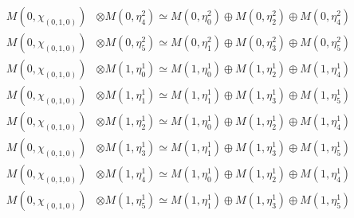 \begin{align*}
M(0,\chi_{(0,1,0)}) &\otimes M(0,\eta^{2}_{4}) \simeq M(0,\eta^{2}_{0}) \oplus M(0,\eta^{2}_{2}) \oplus M(0,\eta^{2}_{4}) \\
M(0,\chi_{(0,1,0)}) &\otimes M(0,\eta^{2}_{5}) \simeq M(0,\eta^{2}_{1}) \oplus M(0,\eta^{2}_{3}) \oplus M(0,\eta^{2}_{5}) \\
M(0,\chi_{(0,1,0)}) &\otimes M(1,\eta^{1}_{0}) \simeq M(1,\eta^{1}_{0}) \oplus M(1,\eta^{1}_{2}) \oplus M(1,\eta^{1}_{4}) \\
M(0,\chi_{(0,1,0)}) &\otimes M(1,\eta^{1}_{1}) \simeq M(1,\eta^{1}_{1}) \oplus M(1,\eta^{1}_{3}) \oplus M(1,\eta^{1}_{5}) \\
M(0,\chi_{(0,1,0)}) &\otimes M(1,\eta^{1}_{2}) \simeq M(1,\eta^{1}_{0}) \oplus M(1,\eta^{1}_{2}) \oplus M(1,\eta^{1}_{4}) \\
M(0,\chi_{(0,1,0)}) &\otimes M(1,\eta^{1}_{3}) \simeq M(1,\eta^{1}_{1}) \oplus M(1,\eta^{1}_{3}) \oplus M(1,\eta^{1}_{5}) \\
M(0,\chi_{(0,1,0)}) &\otimes M(1,\eta^{1}_{4}) \simeq M(1,\eta^{1}_{0}) \oplus M(1,\eta^{1}_{2}) \oplus M(1,\eta^{1}_{4}) \\
M(0,\chi_{(0,1,0)}) &\otimes M(1,\eta^{1}_{5}) \simeq M(1,\eta^{1}_{1}) \oplus M(1,\eta^{1}_{3}) \oplus M(1,\eta^{1}_{5}) \\
\end{align*}

